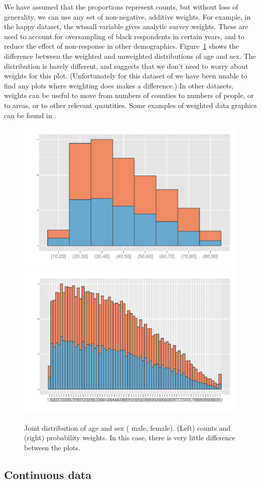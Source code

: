 \documentclass[journal]{vgtc}
\newcommand{\key}[1]
  {\protect \tikz{\fill[#1] rectangle (1ex,1ex);}}
\begin{document}
We have assumed that the proportions represent counts, but without loss of generality, we can use any set of non-negative, additive weights. For example, in the happy dataset, the {\sf wtssall} variable gives analytic survey weights. These are used to account for oversampling of black respondents in certain years, and to reduce the effect of non-response in other demographics. Figure~\ref{fig:weighting} shows the difference between the weighted and unweighted distributions of age and sex. The distribution is barely different, and suggests that we don't need to worry about weights for this plot. (Unfortunately for this dataset of we have been unable to find any plots where weighting does makes a difference.)  In other datasets, weights can be useful to move from numbers of counties to numbers of people, or to areas, or to other relevant quantities. Some examples of weighted data graphics can be found in \citep{unwin:1998,unwin:2003aa,unwin:2006}.

\begin{figure}[htbp]
  \centering
    \includegraphics[width=0.5\linewidth]{wt-count}%
    \includegraphics[width=0.5\linewidth]{wt-wtssall}%
  \caption{Joint distribution of age and sex (\key{male} male, \key{female} female). (Left) counts and (right) probability weights. In this case, there is very little difference between the plots.}
  \label{fig:weighting}
\end{figure}

\subsection{Continuous data}
\label{sub:continuous_data}
\end{document}

